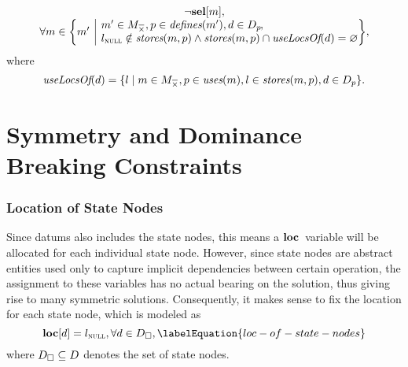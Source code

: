 \begin{equation}
  \begin{array}{c}
    \neg\mVar{sel}[m], \\
    \forall m \in
      \mSetBuilder*{m'}%
                   {%
                     \begin{array}{@{}l@{}}
                       m' \in \mKillMatchCompSet,
                       p \in \mDefines(m'),
                       d \in \mDataSet[p] \hspace{-1pt}, \\
                       \mNullLocation \notin \mStores(m, p)
                       \mAnd
                       \mStores(m, p) \cap \mUseLocsOf(d) = \mEmptySet
                     \end{array}
                   } \!,
  \end{array}
\end{equation}
%
where
%
\begin{equation}
  \mUseLocsOf(d)
  =
  \mSetBuilder{l}%
              {%
                m \in \mKillMatchCompSet,
                p \in \mUses(m),
                l \in \mStores(m, p),
                d \in \mDataSet[p]
              }.
\end{equation}


\section{Symmetry and Dominance Breaking Constraints}



\subsubsection{Location of State Nodes}

Since \glspl{datum} also includes the \glspl{state node}, this means a
$\mVar{loc}$~\gls{variable} will be allocated for each individual \gls{state
  node}.
%
However, since \glspl{state node} are abstract entities used only to capture
implicit dependencies between certain \gls{operation}, the assignment to these
\glspl{variable} has no actual bearing on the \gls{solution}, thus giving rise
to many symmetric \glspl{solution}.
%
Consequently, it makes sense to fix the location for each \gls{state node},
which is modeled as
%
\begin{equation}
  \mVar{loc}[d] = \mNullLocation,
  \forall d \in \mStateDataSet,
  \labelEquation{loc-of-state-nodes}
\end{equation}
%
where \mbox{$\mStateDataSet \subseteq \mDataSet$} denotes the set of
\glspl{state node}.


